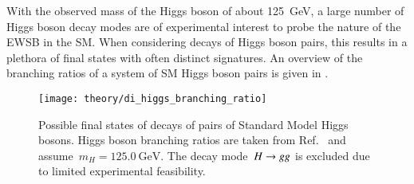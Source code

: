 With the observed mass of the Higgs boson of about \SI{125}{\GeV}, a large
number of Higgs boson decay modes are of experimental interest to probe the
nature of the EWSB in the SM. When considering decays of Higgs boson pairs, this
results in a plethora of final states with often distinct signatures.  An
overview of the branching ratios of a system of SM Higgs boson pairs is given in
.

\begin{figure}[htbp]
  \centering

  \texttt{[image: theory/di\_higgs\_branching\_ratio]}

  \caption{Possible final states of decays of pairs of Standard Model Higgs
    bosons. Higgs boson branching ratios are taken from
    Ref.~\cite{deFlorian:2016spz} and assume~$m_{H} = \SI{125.0}{\GeV}$. The
    decay mode~$H \rightarrow g g$ is excluded due to limited experimental feasibility.}%
  \label{fig:hh_branching_ratios}
\end{figure}

